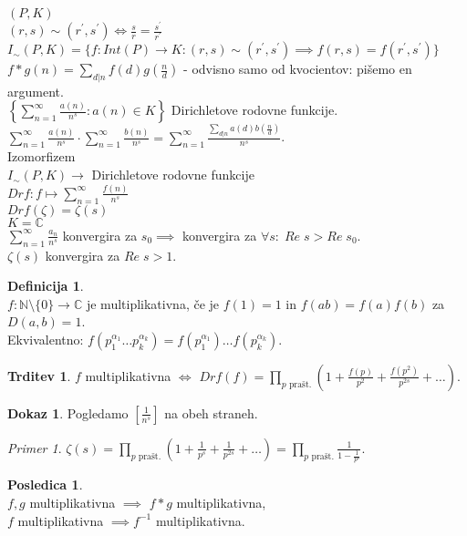 \documentclass[a4paper, 12pt]{book}
\theoremstyle{definition}
\newtheorem{defn}[counter]{Definicija}
\newtheorem{conseq}[counter]{Posledica}
\newtheorem{claim}[counter]{Trditev}
\newtheorem{pro}[counter]{Dokaz}
\theoremstyle{remark}
\newtheorem*{ex}{Primer}
\newcommand{\N}{\mathbb{N}}
\newcommand{\C}{\mathbb{C}}
\begin{document}
$(P, K)$ \\
$(r, s) \sim (r^{'}, s^{'}) \iff \frac{s}{r} = \frac{s^{'}}{r^{'}}$ \\
$I_{\sim} (P, K) = \{f: Int(P) \to K: (r, s) \sim (r^{'}, s^{'}) \implies f(r, s) = f(r^{'}, s^{'})\}$ \\
$f * g(n) = \sum_{d | n} f(d) g\left(\frac{n}{d}\right)$ - odvisno samo od kvocientov: pišemo en argument. \\
$\left\{ \sum_{n=1}^{\infty} \frac{a(n)}{n^s}: a(n) \in K\right\}$ Dirichletove rodovne funkcije. \\
$\sum_{n=1}^{\infty} \frac{a(n)}{n^s} \cdot \sum_{n=1}^{\infty} \frac{b(n)}{n^s} =
\sum_{n=1}^{\infty} \frac{\sum_{d | n} a(d) b\left(\frac{n}{d}\right)}{n^s}$. \\
Izomorfizem \\
$I_{\sim} (P, K) \to$ Dirichletove rodovne funkcije \\
$Drf: f \mapsto \sum_{n=1}^{\infty} \frac{f(n)}{n^s}$ \\
$Drf(\zeta) = \zeta(s)$ \\
$K = \C$ \\
$\sum_{n=1}^{\infty} \frac{a_n}{n^s}$ konvergira za $s_0 \implies$ konvergira za $\forall s: \; Re \; s > Re \; s_0$. \\
$\zeta(s)$ konvergira za $Re \; s > 1$.
\begin{defn} \text{} \\
  $f: \N \setminus \{0\} \to \C$ je multiplikativna, če je $f(1) = 1$ in $f(ab) = f(a) f(b)$ za $D(a, b) = 1$. \\
  Ekvivalentno: $f\left(p_1^{\alpha_1} \dots p_k^{\alpha_k}\right) =
  f\left(p_1^{\alpha_1}\right) \dots f\left(p_k^{\alpha_k}\right)$.
\end{defn}
\begin{claim}
  $f$ multiplikativna $\iff$ $Drf(f) =
  \prod_{p \text{ prašt.}} \left(1 + \frac{f(p)}{p^2} + \frac{f(p^2)}{p^{2s}} + \dots\right)$.
\end{claim}
\begin{pro}
  Pogledamo $\left[\frac{1}{n^s}\right]$ na obeh straneh.
\end{pro}
\begin{ex}
  $\zeta(s) = \prod_{p \text{ prašt.}} \left(1 + \frac{1}{p^s} + \frac{1}{p^{2s}} + \dots \right)
  = \prod_{p \text{ prašt.}} \frac{1}{1 - \frac{1}{p^s}}$.
\end{ex}
\begin{conseq} \text{} \\
  $f, g$ multiplikativna $\implies$ $f * g$ multiplikativna, \\
  $f$ multiplikativna $\implies f^{-1}$ multiplikativna. 
\end{conseq}
\end{document}
